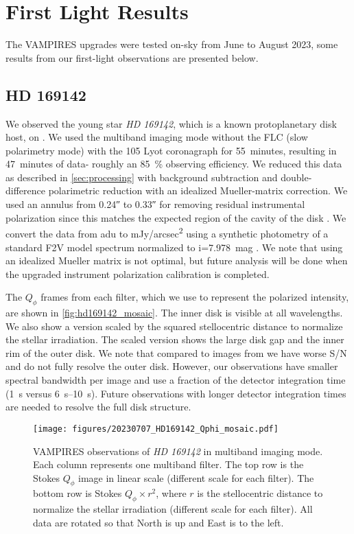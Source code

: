 \section{First Light Results}\label{sec:firstlight}

The VAMPIRES upgrades were tested on-sky from June to August 2023, some results from our first-light observations are presented below.

\subsection{HD 169142\label{sec:hd169142}}

We observed the young star \textit{HD 169142}, which is a known protoplanetary disk host, on . We used the multiband imaging mode without the FLC (slow polarimetry mode) with the \SI{105}{\mas} Lyot coronagraph for \SI{55}{minutes}, resulting in \SI{47}{minutes} of data- roughly an \SI{85}{\%} observing efficiency. We reduced this data as described in \autoref{sec:processing} with background subtraction and double-difference polarimetric reduction with an idealized Mueller-matrix correction. We used an annulus from \ang{;;0.24} to \ang{;;0.33} for removing residual instrumental polarization since this matches the expected region of the cavity of the disk \citep{bertrang_hd_2018}. We convert the data from \si{adu} to \si{mJy/arcsec^2} using a synthetic photometry of a standard F2V model spectrum \citep{pickles_stellar_1998} normalized to i=\SI{7.978}{mag} \citep{zacharias_fourth_2013}. We note that using an idealized Mueller matrix is not optimal, but future analysis will be done when the upgraded instrument polarization calibration is completed.

The $Q_\phi$ frames from each filter, which we use to represent the polarized intensity, are shown in \autoref{fig:hd169142_mosaic}. The inner disk is visible at all wavelengths. We also show a version scaled by the squared stellocentric distance to normalize the stellar irradiation. The scaled version shows the large disk gap and the inner rim of the outer disk. We note that compared to images from \cite{bertrang_hd_2018} we have worse S/N and do not fully resolve the outer disk. However, our observations have smaller spectral bandwidth per image and use a fraction of the detector integration time (\SI{1}{s} versus \SIrange{6}{10}{s}). Future observations with longer detector integration times are needed to resolve the full disk structure.

\begin{figure*}[t]
    \centering
    \texttt{[image: figures/20230707\_HD169142\_Qphi\_mosaic.pdf]}
    \caption{ VAMPIRES observations of \textit{HD 169142} in multiband imaging mode. Each column represents one multiband filter. The top row is the Stokes $Q_\phi$ image in linear scale (different scale for each filter). The bottom row is  Stokes $Q_\phi\times r^2$, where $r$ is the stellocentric distance to normalize the stellar irradiation (different scale for each filter). All data are rotated so that North is up and East is to the left.\label{fig:hd169142_mosaic}}
\end{figure*}

